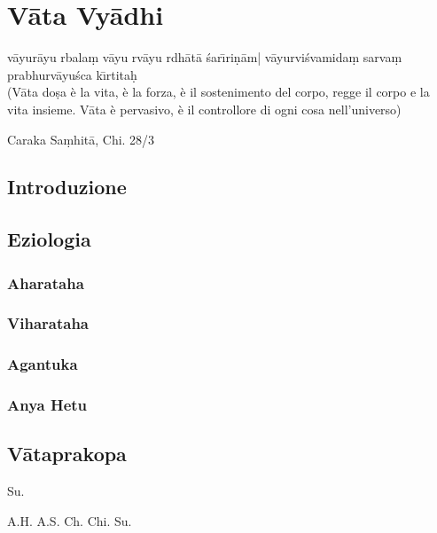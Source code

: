 

\chapter{V\={a}ta Vy\={a}dhi}


\setlength{\epigraphwidth}{0.5\textwidth}

\epigraph{v\={a}yur\={a}yu rbala\d{m} v\={a}yu rv\={a}yu rdh\={a}t\={a} \'{s}ar\={\i}ri\d{n}\={a}m|
v\={a}yurvi\'{s}vamida\d{m} sarva\d{m} prabhurv\={a}yu\'{s}ca k\={\i}rtita\d{h} \\ (V\={a}ta
 do\d{s}a è la vita, è la forza, è il sostenimento del corpo, regge il corpo e la vita insieme. V\={a}ta
 è pervasivo, è il controllore di ogni cosa nell'universo)}{Caraka Sa\d{m}hit\={a}, Chi. 28/3}

 
 \section{Introduzione}

 \section{Eziologia}
  
  	\subsection{Aharataha}


  	\subsection{Viharataha}
  	

  	\subsection{Agantuka}


  	\subsection{Anya Hetu}


 \section{V\={a}taprakopa}


\ac{Su.}

\ac{A.H.}
\ac{A.S.}
\ac{Ch.}
\ac{Chi.}
\ac{Su.}
